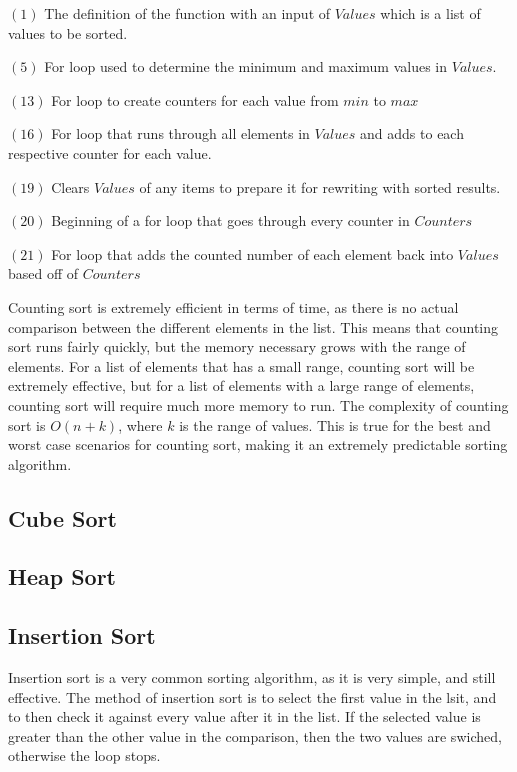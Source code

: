 \documentclass{article}
\begin{document}
\begin{multicols}{2}
$(1)$ The definition of the function with an input of $Values$ which is a list of values to be sorted.

$(5)$ For loop used to determine the minimum and maximum values in $Values$.

$(13)$ For loop to create counters for each value from $min$ to $max$

$(16)$ For loop that runs through all elements in $Values$ and adds to each respective counter for each value.

$(19)$ Clears $Values$ of any items to prepare it for rewriting with sorted results.

$(20)$ Beginning of a for loop that goes through every counter in $Counters$

$(21)$ For loop that adds the counted number of each element back into $Values$ based off of $Counters$
\end{multicols}
\begin{multicols}{2}
Counting sort is extremely efficient in terms of time, as there is no actual comparison between the different elements in the list. This means that counting sort runs fairly quickly, but the memory necessary grows with the range of elements. For a list of elements that has a small range, counting sort will be extremely effective, but for a list of elements with a large range of elements, counting sort will require much more memory to run. The complexity of counting sort is $O(n+k)$, where $k$ is the range of values. This is true for the best and worst case scenarios for counting sort, making it an extremely predictable sorting algorithm.
\end{multicols}
\subsection{Cube Sort}
\subsection{Heap Sort}
\subsection{Insertion Sort}
\begin{multicols}{2}
Insertion sort is a very common sorting algorithm, as it is very simple, and still effective. The method of insertion sort is to select the first value in the lsit, and to then check it against every value after it in the list. If the selected value is greater than the other value in the comparison, then the two values are swiched, otherwise the loop stops.
\end{multicols}
\end{document}
